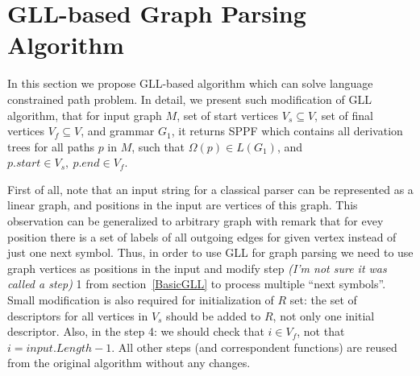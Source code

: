 \section{GLL-based Graph Parsing Algorithm}


In this section we propose GLL-based algorithm which can solve language constrained path problem.
In detail, we present such modification of GLL algorithm, that for input graph $M$, set of start vertices $V_s\subseteq V$, set of final vertices $V_f\subseteq V$, and grammar $G_1$, it returns SPPF which contains all derivation trees for all paths $p$ in $M$, such that $\Omega(p) \in L(G_1)$, and $p.start \in V_s,\ p.end \in V_f$.

First of all, note that an input string for a classical parser can be represented as a linear graph, and positions in the input are vertices of this graph.
This observation can be generalized to arbitrary graph with remark that for evey position there is a set of labels of all outgoing edges for given vertex instead of just one next symbol. 
Thus, in order to use GLL for graph parsing we need to use graph vertices as positions in the input and modify step \emph{(I'm not sure it was called a step)} 1 from section~\ref{BasicGLL} to process multiple ``next symbols''.
Small modification is also required for initialization of $R$ set: the set of descriptors for all vertices in $V_s$ should be added to $R$, not only one initial descriptor.
Also, in the step 4: we should check that $i \in V_f$, not that $i = input.Length - 1$.
All other steps (and correspondent functions) are reused from the original algorithm without any changes.

